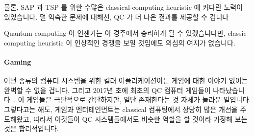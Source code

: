 물론, SAP 과 TSP 를 위한 수많은 classical-computing heuristic 에 커다란 노력이
있었습니다.
덜 익숙한 문제에 대해선, QC 가 더 나은 결과를 제공할 수
겁니다~\cite{JohnPreskill2018NISQ}

Quantum computing 이 언젠가는 이 경주에서 승리하게 될 수 있겠습니다만,
classic-computing heuristic 이 인상적인 경쟁을 보일 것임에도 의심의 여지가
없습니다.

\paragraph{Gaming}
\label{sec:future:Gaming}

어떤 종류의 컴퓨터 시스템을 위한 킬러 어플리케이션이든 게임에 대한 이야기
없이는 완벽할 수 없을 겁니다.
그리고 2017년 초에 최초의 QC 컴퓨터 게임들이
나타났습니다~\cite{JamesWootton2017IBMQEgame,JamesWootton2017IBMQEbattleship}.
이 게임들은 극단적으로 간단하지만, 일단 존재한다는 것 자체가 놀라운 일입니다.
그렇다고는 해도, 게임과 엔터테인먼트는 classical 컴퓨팅에서 상당히 많은 개선을
주도해왔고, 따라서 이것들이 QC 시스템들에서도 비슷한 역할을 할 것이라 가정해
보는 것은 합리적입니다.
\iffalse

